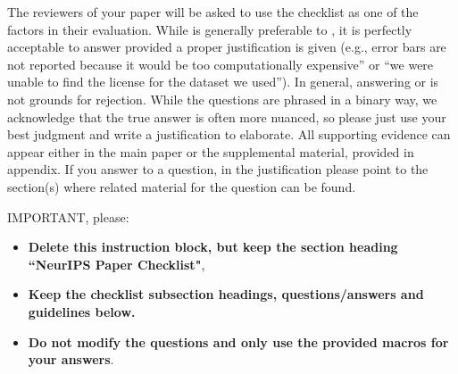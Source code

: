 \documentclass{article}
\begin{document}
The reviewers of your paper will be asked to use the checklist as one of the factors in their evaluation. While \answerYes{} is generally preferable to \answerNo{}, it is perfectly acceptable to answer \answerNo{} provided a proper justification is given (e.g., error bars are not reported because it would be too computationally expensive'' or ``we were unable to find the license for the dataset we used''). In general, answering \answerNo{} or \answerNA{} is not grounds for rejection. While the questions are phrased in a binary way, we acknowledge that the true answer is often more nuanced, so please just use your best judgment and write a justification to elaborate. All supporting evidence can appear either in the main paper or the supplemental material, provided in appendix. If you answer \answerYes{} to a question, in the justification please point to the section(s) where related material for the question can be found.

IMPORTANT, please:
\begin{itemize}
    \item {\bf Delete this instruction block, but keep the section heading ``NeurIPS Paper Checklist"},
    \item  {\bf Keep the checklist subsection headings, questions/answers and guidelines below.}
    \item {\bf Do not modify the questions and only use the provided macros for your answers}.
\end{itemize}


\end{document}
